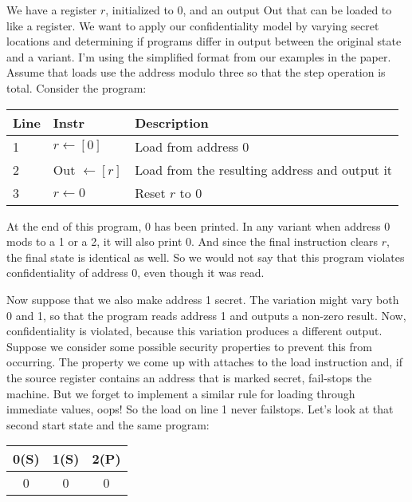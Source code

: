 \documentclass{article}
\begin{document}
We have a register \(r\), initialized to 0, and an output {\sc Out} that can be loaded to like a register.
We want to apply our confidentiality model by varying secret locations and determining if programs
differ in output between the original state and a variant. I'm using the simplified format from our
examples in the paper. Assume that loads use the address modulo three so that the step operation is
total. Consider the program:

\vspace{\abovedisplayskip}

\begin{tabular}{l l l}
  Line & Instr & Description \\
  \hline
  1 & \(r \leftarrow [0]\) & Load from address 0 \\
  2 & {\sc Out} \(\leftarrow [r]\) & Load from the resulting address and output it \\
  3 & \(r \leftarrow 0\) & Reset \(r\) to 0 \\
\end{tabular}

\vspace{\belowdisplayskip}

At the end of this program, 0 has been printed. In any variant when address 0 mods to a 1 or a 2, it
will also print 0. And since the final instruction clears \(r\), the final state is identical as well.
So we would not say that this program violates confidentiality of address 0, even though it was read.

Now suppose that we also make address 1 secret. The variation might vary both 0 and 1, so that the
program reads address 1 and outputs a non-zero result. Now, confidentiality is violated, because this
variation produces a different output. Suppose we consider some possible security properties to
prevent this from occurring. The property we come up with attaches to the load instruction and,
if the source register contains an address that is marked secret, fail-stops the machine. But we forget
to implement a similar rule for loading through immediate values, oops! So the load on line 1 never failstops.
Let's look at that second start state and the same program:

\begin{tabular}{| c | c | c |}
  \hline
  0(S) & 1(S) & 2(P) \\
  \hline
  0 & 0 & 0 \\
  \hline
\end{tabular}
\end{document}
